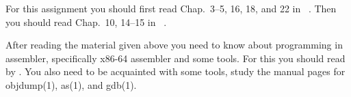 For this assignment you should first read
Chap.~3--5, 16, 18, and 22 in 
~\cite{Anderson2008sea}.
Then you should read Chap.~10, 14--15 in 
~\cite{Gollmann2011cs}.

After reading the material given above you need to know about programming in 
assembler, specifically x86-64 assembler and some tools.
For this you should read  by \citet{assembly}.
You also need to be acquainted with some tools, study the manual pages for 
objdump(1), as(1), and gdb(1).
